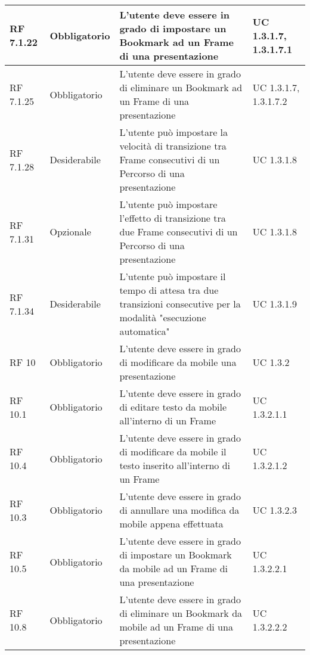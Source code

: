 {\begin{longtable} [c]{| p{2.5cm} | p{2.5cm} | p{6cm} |p{2.5cm}|}
		\hline
		RF 7.1.22 & Obbligatorio & L'utente deve essere in grado di impostare un Bookmark\ped{g} ad un Frame\ped{g} di una presentazione & UC 1.3.1.7, 1.3.1.7.1\\
		\hline
		RF 7.1.25 & Obbligatorio & L'utente deve essere in grado di eliminare un Bookmark\ped{g} ad un Frame\ped{g} di una presentazione & UC 1.3.1.7, 1.3.1.7.2\\
		\hline
		RF 7.1.28 & Desiderabile & L'utente può impostare la velocità di transizione tra Frame\ped{g} consecutivi di un Percorso\ped{g} di una presentazione & UC 1.3.1.8\\
		\hline
		RF 7.1.31 & Opzionale & L'utente può impostare l’effetto di transizione tra due Frame\ped{g} consecutivi di un Percorso\ped{g} di una presentazione & UC 1.3.1.8\\
		\hline
		RF 7.1.34 & Desiderabile & L'utente può impostare il tempo di attesa tra due transizioni consecutive per la modalità "esecuzione automatica" & UC 1.3.1.9\\
		\hline
		RF 10 & Obbligatorio & L'utente deve essere in grado di modificare da mobile una presentazione & UC 1.3.2\\
		\hline
		RF 10.1 & Obbligatorio & L'utente deve essere in grado di editare testo da mobile all'interno di un Frame\ped{g} & UC 1.3.2.1.1\\
		\hline
		RF 10.4 & Obbligatorio & L'utente deve essere in grado di modificare da mobile il testo inserito all'interno di un Frame\ped{g} & UC 1.3.2.1.2\\
		\hline
		RF 10.3 & Obbligatorio & L'utente deve essere in grado di annullare una modifica da mobile appena effettuata & UC 1.3.2.3\\
		\hline
		RF 10.5 & Obbligatorio & L'utente deve essere in grado di impostare un Bookmark\ped{g} da mobile ad un Frame\ped{g} di una presentazione & UC 1.3.2.2.1\\
		\hline
		RF 10.8 & Obbligatorio & L'utente deve essere in grado di eliminare un Bookmark\ped{g} da mobile ad un Frame\ped{g} di una presentazione & UC 1.3.2.2.2\\
		

\end{longtable}}
